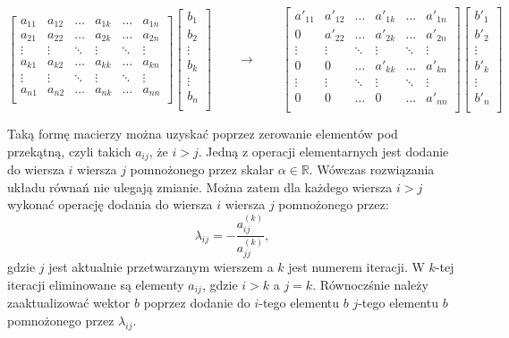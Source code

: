\documentclass{article}
\begin{document}
\begin{center}
    $$
    \begin{bmatrix}
        a_{11} & a_{12} & \dots & a_{1k} & \dots & a_{1n} \\
        a_{21} & a_{22} & \dots & a_{2k} & \dots & a_{2n} \\
        \vdots & \vdots & \ddots &\vdots & \ddots & \vdots \\
        a_{k1} & a_{k2} & \dots & a_{kk} & \dots & a_{kn} \\
        \vdots & \vdots & \ddots & \vdots & \ddots & \vdots \\
        a_{n1} & a_{n2} & \dots & a_{nk} & \dots & a_{nn} \\
    \end{bmatrix}
    \begin{bmatrix}
        b_{1} \\
        b_{2} \\
        \vdots \\
        b_{k} \\
        \vdots \\
        b_{n} \\
    \end{bmatrix}
    \qquad
    \longrightarrow
    \qquad
    \begin{bmatrix}
        a'_{11} & a'_{12} & \dots & a'_{1k} & \dots & a'_{1n} \\
        0 & a'_{22} & \dots & a'_{2k} & \dots & a'_{2n} \\
        \vdots & \vdots & \ddots &\vdots & \ddots & \vdots \\
        0 & 0 & \dots & a'_{kk} & \dots & a'_{kn} \\
        \vdots & \vdots & \ddots & \vdots & \ddots & \vdots \\
        0 & 0 & \dots & 0 & \dots & a'_{nn} \\
    \end{bmatrix}
    \begin{bmatrix}
        b'_{1} \\
        b'_{2} \\
        \vdots \\
        b'_{k} \\
        \vdots \\
        b'_{n} \\
    \end{bmatrix}
    $$
\end{center}
Taką formę macierzy można uzyskać poprzez zerowanie elementów pod przekątną, czyli takich $a_{ij}$, że $i > j$. 
Jedną z operacji elementarnych jest dodanie do wiersza $i$ wiersza $j$ pomnożonego przez skalar $\alpha \in \mathbb{R}$. Wówczas rozwiązania układu równań nie ulegają zmianie.
Można zatem dla każdego wiersza $i > j$ wykonać operację dodania do wiersza $i$ wiersza $j$ pomnożonego przez:
$$\lambda_{ij} = -\frac{a^{(k)}_{ij}}{a^{(k)}_{jj}},$$
gdzie $j$ jest aktualnie przetwarzanym wierszem a $k$ jest numerem iteracji. W $k$-tej iteracji eliminowane są elementy $a_{ij}$, gdzie $i > k$ a $j = k$.
Równoczśnie należy zaaktualizować wektor $b$ poprzez dodanie do $i$-tego elementu $b$ $j$-tego elementu $b$ pomnożonego przez $\lambda_{ij}$.
\end{document}
